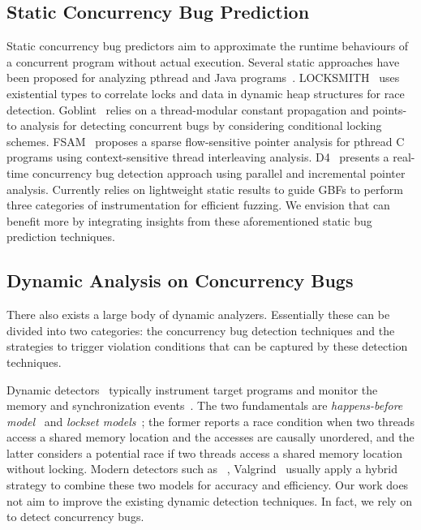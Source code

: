 \subsection{Static Concurrency Bug Prediction}
Static concurrency bug predictors aim to approximate the runtime behaviours of a concurrent program without actual execution. Several static approaches have been proposed for analyzing pthread and Java  programs~\cite{pratikakis2006locksmith,Vojdani2009,DBLP:conf/cgo/SuiDX16,Liupldi2018,racerdoopsla2018}. LOCKSMITH~\cite{pratikakis2006locksmith} uses existential types to correlate locks and data in dynamic heap structures for race detection. Goblint~\cite{Vojdani2009} relies on a thread-modular constant propagation and points-to analysis for detecting concurrent bugs by considering conditional locking schemes. FSAM~\cite{DBLP:conf/cgo/SuiDX16} proposes a sparse flow-sensitive pointer analysis for pthread C programs  using context-sensitive thread interleaving analysis. 
D4~\cite{Liupldi2018} presents a real-time concurrency bug detection approach using parallel and incremental pointer analysis. 
Currently \mtfuzz relies on lightweight static results to guide GBFs to perform three categories of instrumentation for efficient fuzzing. We envision that \mtfuzz can benefit more by integrating insights from these aforementioned static bug prediction techniques.

\subsection{Dynamic Analysis on Concurrency Bugs}
There also exists a large body of dynamic analyzers.
Essentially these can be divided into two categories: the concurrency bug detection techniques and the strategies to trigger violation conditions that can be captured by these detection techniques.


Dynamic detectors~\cite{pldi09_fasttrack,lockset_SavageABNS97,kcc:tsan,JinTLL10,YuNPP12} typically instrument target programs and monitor the memory and synchronization events~\cite{mtbugs_survey}. The two fundamentals are \emph{happens-before model}~\cite{pldi09_fasttrack} and \emph{lockset models}~\cite{lockset_SavageABNS97}; the former reports a race condition when two threads access a shared memory location and the accesses are
causally unordered, and the latter considers a potential race if two threads access a shared memory location without locking. Modern detectors such as \ts~\cite{kcc:tsan}, Valgrind~\cite{helgrind} usually apply a hybrid strategy to combine these two models for accuracy and efficiency. Our work does not aim to improve the existing dynamic detection techniques. In fact, we rely on \ts to detect concurrency bugs.



